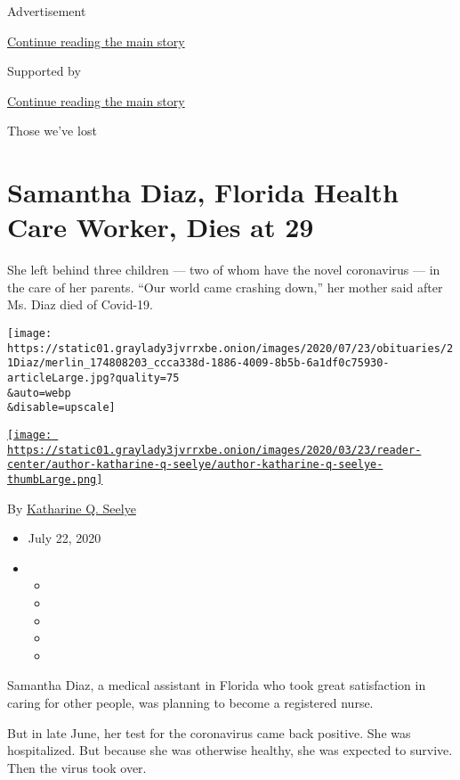 Advertisement

\protect\hyperlink{after-top}{Continue reading the main story}

Supported by

\protect\hyperlink{after-sponsor}{Continue reading the main story}

Those we've lost

\hypertarget{samantha-diaz-florida-health-care-worker-dies-at-29}{%
\section{Samantha Diaz, Florida Health Care Worker, Dies at
29}\label{samantha-diaz-florida-health-care-worker-dies-at-29}}

She left behind three children --- two of whom have the novel
coronavirus --- in the care of her parents. ``Our world came crashing
down,'' her mother said after Ms. Diaz died of Covid-19.

\texttt{[image: https://static01.graylady3jvrrxbe.onion/images/2020/07/23/obituaries/21Diaz/merlin\_174808203\_ccca338d-1886-4009-8b5b-6a1df0c75930-articleLarge.jpg?quality=75\\\&auto=webp\\\&disable=upscale]}

\href{https://www.nytimes3xbfgragh.onion/by/katharine-q-seelye}{\texttt{[image: https://static01.graylady3jvrrxbe.onion/images/2020/03/23/reader-center/author-katharine-q-seelye/author-katharine-q-seelye-thumbLarge.png]}}

By
\href{https://www.nytimes3xbfgragh.onion/by/katharine-q-seelye}{Katharine
Q. Seelye}

\begin{itemize}
\item
  July 22, 2020
\item
  \begin{itemize}
  \item
  \item
  \item
  \item
  \item
  \end{itemize}
\end{itemize}

Samantha Diaz, a medical assistant in Florida who took great
satisfaction in caring for other people, was planning to become a
registered nurse.

But in late June, her test for the coronavirus came back positive. She
was hospitalized. But because she was otherwise healthy, she was
expected to survive. Then the virus took over.

